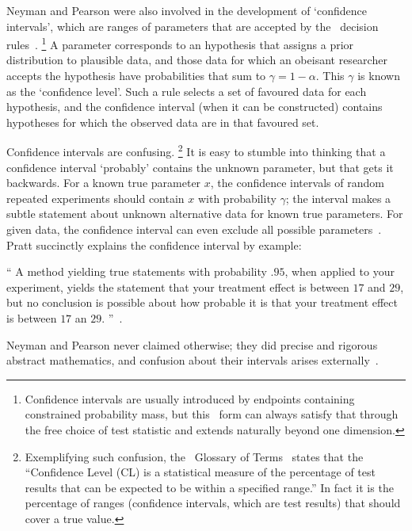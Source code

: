 Neyman and Pearson were also involved in the development of
`confidence intervals', which are ranges of parameters that are
accepted by the \pvalue\ decision rules~\cite{
clopper1934confidence,
neyman1935Intervals,
Neyman1937Outline
}.%
\footnote{%
Confidence intervals are usually introduced by endpoints containing constrained
probability mass, but this \pvalue\ form can always satisfy that through the
free choice of test statistic and extends naturally beyond one dimension.%
}
A parameter corresponds to an hypothesis that assigns a prior distribution to
plausible data, and those data for which an obeisant researcher accepts the
hypothesis have probabilities that sum to $\gamma = 1 - \alpha$.
This $\gamma$ is known as the `confidence level'.
Such a rule selects a set of favoured data for each hypothesis, and the
confidence interval (when it can be constructed) contains hypotheses for which
the observed data are in that favoured set.

Confidence intervals are confusing.%
\footnote{%
Exemplifying such confusion,
the \atlas\ Glossary of Terms~\cite{atlas2022glossary} states that the
``Confidence Level (CL) is a statistical measure of the percentage of test
results that can be expected to be within a specified range.''
In fact it is the percentage of ranges
(confidence intervals, which are test results)
that should cover a true value.%
}
It is easy to stumble into thinking that a confidence interval
`probably' contains the unknown parameter, but that gets it backwards.
For a known true parameter $x$, the confidence intervals of random repeated
experiments should contain $x$ with probability $\gamma$;
the interval makes a subtle statement about unknown alternative data for
known true parameters.
For given data, the confidence interval can even exclude all possible
parameters~\cite{
pratt1961testing,
Jaynes1976intervals
}.
Pratt succinctly explains the confidence interval by example:
\begin{displayquote}
\small
``%
A method yielding true statements with probability $.95$, when applied to your
experiment, yields the statement that your treatment effect is between $17$ and
$29$, but no conclusion is possible about how probable it is that your
treatment effect is between $17$ an $29$.%
''~\cite{pratt1961testing}.
\end{displayquote}
Neyman and Pearson never claimed otherwise; they did precise and rigorous
abstract mathematics, and confusion about their intervals arises
externally~\cite{jaynes2003probability}.

